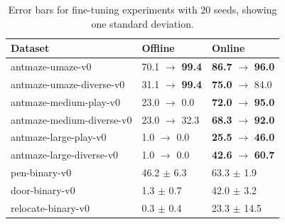 \begin{table}
\scriptsize
\begin{tabular}{ l ||p{1.5cm} | p{1.5cm}  }
    \centering
    Dataset & Offline & Online \\
    \hline
    antmaze-umaze-v0 & 70.1 \; $\rightarrow$ \textbf{99.4} & \textbf{86.7} \; $\rightarrow$ \textbf{96.0} \\
    antmaze-umaze-diverse-v0 & 31.1 \; $\rightarrow$ \textbf{99.4} & \textbf{75.0} \; $\rightarrow$ 84.0 \\
    antmaze-medium-play-v0 & 23.0 \; $\rightarrow$ 0.0 & \textbf{72.0} \; $\rightarrow$ \textbf{95.0} \\
    antmaze-medium-diverse-v0 & 23.0 \; $\rightarrow$ 32.3 & \textbf{68.3} \; $\rightarrow$ \textbf{92.0} \\
    antmaze-large-play-v0 & 1.0 \; \; $\rightarrow$ 0.0 & \textbf{25.5} \; $\rightarrow$ \textbf{46.0} \\
    antmaze-large-diverse-v0 & 1.0 \; \; $\rightarrow$ 0.0 & \textbf{42.6} \; $\rightarrow$ \textbf{60.7} \\ \hline
    pen-binary-v0 & 46.2 $\pm$ 6.3 & 63.3 \; $\pm$ 1.9 \\
    door-binary-v0 & 1.3 \; $\pm$ 0.7 & 42.0 \; $\pm$ 3.2 \\
    relocate-binary-v0 & 0.3 \; $\pm$ 0.4 & 23.3 \; $\pm$ 14.5 \\ \hline
\end{tabular}
\caption{Error bars for fine-tuning experiments with 20 seeds, showing one standard deviation.}
\label{tab:finetuning}
\end{table}

